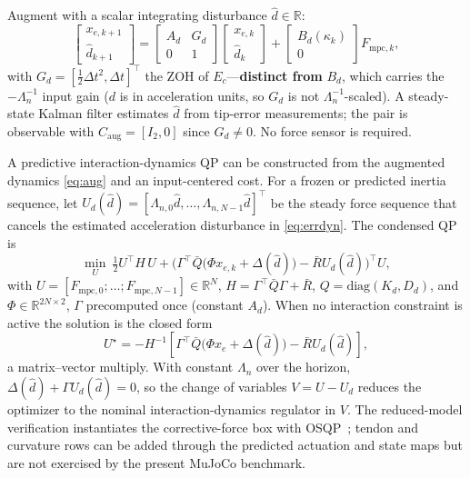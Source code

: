 Augment with a scalar integrating disturbance $\hat d\in\mathbb{R}$:
\begin{equation}
\begin{bmatrix}x_{e,k+1}\\\hat d_{k+1}\end{bmatrix}=\begin{bmatrix}A_d&G_d\\0&1\end{bmatrix}\begin{bmatrix}x_{e,k}\\\hat d_k\end{bmatrix}+\begin{bmatrix}B_d(\kappa_k)\\0\end{bmatrix}F_{\text{mpc},k},
\label{eq:aug}
\end{equation}
with $G_d=[\tfrac12\Delta t^2,\Delta t]^\top$ the ZOH of $E_c$---\textbf{distinct from} $B_d$, which carries the $-\Lambda_n^{-1}$ input gain ($d$ is in acceleration units, so $G_d$ is not $\Lambda_n^{-1}$-scaled). A steady-state Kalman filter estimates $\hat d$ from tip-error measurements; the pair is observable with $C_{\text{aug}}=[I_2,0]$ since $G_d\neq 0$. No force sensor is required.

A predictive interaction-dynamics QP can be constructed from the augmented dynamics \eqref{eq:aug} and an input-centered cost. For a frozen or predicted inertia sequence, let
$U_d(\hat d)=[\Lambda_{n,0}\hat d,\ldots,\Lambda_{n,N-1}\hat d]^\top$ be the steady force sequence that cancels the estimated acceleration disturbance in \eqref{eq:errdyn}. The condensed QP is
\begin{equation}
\min_{U}\ \tfrac12 U^\top H\,U
+ \Big(\Gamma^\top\bar Q\big(\Phi x_{e,k}+\Delta(\hat d)\big)-\bar R U_d(\hat d)\Big)^\top U,
\label{eq:qp}
\end{equation}
with $U=[F_{\text{mpc},0};\ldots;F_{\text{mpc},N-1}]\in\mathbb{R}^N$, $H=\Gamma^\top\bar Q\Gamma+\bar R$, $Q=\text{diag}(K_d,D_d)$, and $\Phi\in\mathbb{R}^{2N\times2}$, $\Gamma$ precomputed once (constant $A_d$). When no interaction constraint is active the solution is the closed form
\begin{equation}
U^\star=-H^{-1}\!\left[\Gamma^\top\bar Q\big(\Phi x_e+\Delta(\hat d)\big)-\bar R U_d(\hat d)\right],
\label{eq:unconstrained_centered}
\end{equation}
a matrix--vector multiply. With constant $\Lambda_n$ over the horizon, $\Delta(\hat d)+\Gamma U_d(\hat d)=0$, so the change of variables $V=U-U_d$ reduces the optimizer to the nominal interaction-dynamics regulator in $V$. The reduced-model verification instantiates the corrective-force box with OSQP~\cite{osqp}; tendon and curvature rows can be added through the predicted actuation and state maps but are not exercised by the present MuJoCo benchmark.

